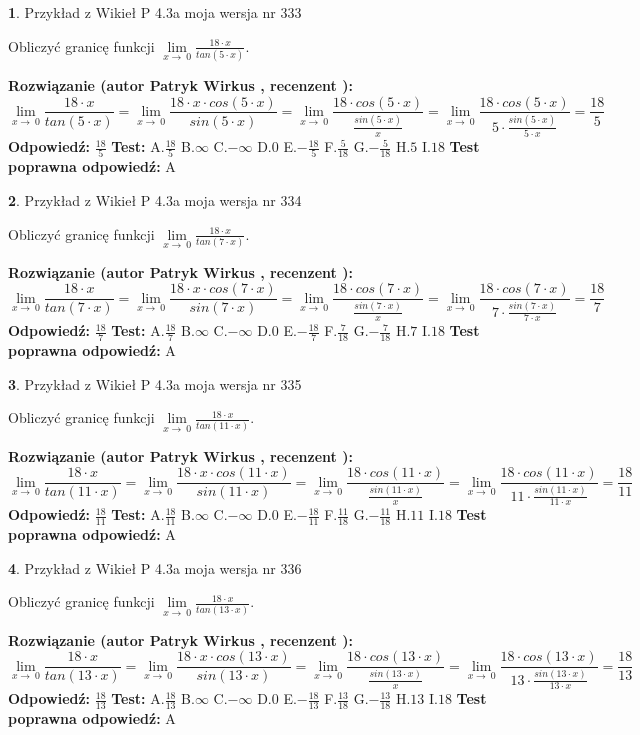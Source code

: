 \documentclass[12pt, a4paper]{article}
\theoremstyle{definition} %
\newtheorem{zad}{}
\newcommand{\zadStart}[1]{\begin{zad}#1\newline}
\newcommand{\zadStop}{\end{zad}}
\newcommand{\rozwStart}[2]{\noindent \textbf{Rozwiązanie (autor #1 , recenzent #2): }\newline}
\newcommand{\rozwStop}{\newline}
\newcommand{\odpStart}{\noindent \textbf{Odpowiedź:}\newline}
\newcommand{\odpStop}{\newline}
\newcommand{\testStart}{\noindent \textbf{Test:}\newline}
\newcommand{\testStop}{\newline}
\newcommand{\kluczStart}{\noindent \textbf{Test poprawna odpowiedź:}\newline}
\newcommand{\kluczStop}{\newline}
\begin{document}
\zadStart{Przykład z Wikieł P 4.3a moja wersja nr 333}


Obliczyć granicę funkcji $\lim\limits_{x\to\ 0}\frac{18 \cdot x}{tan(5 \cdot x)}$.
\zadStop
\rozwStart{Patryk Wirkus}{}
$$\lim\limits_{x\to\ 0}\frac{18 \cdot x}{tan(5 \cdot x)}=\lim\limits_{x\to\ 0}\frac{18 \cdot x \cdot cos(5 \cdot x)}{sin(5 \cdot x)}=\lim\limits_{x\to\ 0}\frac{18 \cdot cos(5 \cdot x)}{\frac{sin(5 \cdot x)}{x}}=\lim\limits_{x\to\ 0}\frac{18 \cdot cos(5 \cdot x)}{5 \cdot \frac{sin(5 \cdot x)}{5 \cdot x}} = \frac{18}{5}$$
\rozwStop
\odpStart
$\frac{18}{5}$
\odpStop
\testStart
A.$\frac{18}{5}$
B.$\infty$
C.$-\infty$
D.$0$
E.$-\frac{18}{5}$
F.$\frac{5}{18}$
G.$-\frac{5}{18}$
H.$5$
I.$18$
\testStop
\kluczStart
A
\kluczStop



\zadStart{Przykład z Wikieł P 4.3a moja wersja nr 334}


Obliczyć granicę funkcji $\lim\limits_{x\to\ 0}\frac{18 \cdot x}{tan(7 \cdot x)}$.
\zadStop
\rozwStart{Patryk Wirkus}{}
$$\lim\limits_{x\to\ 0}\frac{18 \cdot x}{tan(7 \cdot x)}=\lim\limits_{x\to\ 0}\frac{18 \cdot x \cdot cos(7 \cdot x)}{sin(7 \cdot x)}=\lim\limits_{x\to\ 0}\frac{18 \cdot cos(7 \cdot x)}{\frac{sin(7 \cdot x)}{x}}=\lim\limits_{x\to\ 0}\frac{18 \cdot cos(7 \cdot x)}{7 \cdot \frac{sin(7 \cdot x)}{7 \cdot x}} = \frac{18}{7}$$
\rozwStop
\odpStart
$\frac{18}{7}$
\odpStop
\testStart
A.$\frac{18}{7}$
B.$\infty$
C.$-\infty$
D.$0$
E.$-\frac{18}{7}$
F.$\frac{7}{18}$
G.$-\frac{7}{18}$
H.$7$
I.$18$
\testStop
\kluczStart
A
\kluczStop



\zadStart{Przykład z Wikieł P 4.3a moja wersja nr 335}


Obliczyć granicę funkcji $\lim\limits_{x\to\ 0}\frac{18 \cdot x}{tan(11 \cdot x)}$.
\zadStop
\rozwStart{Patryk Wirkus}{}
$$\lim\limits_{x\to\ 0}\frac{18 \cdot x}{tan(11 \cdot x)}=\lim\limits_{x\to\ 0}\frac{18 \cdot x \cdot cos(11 \cdot x)}{sin(11 \cdot x)}=\lim\limits_{x\to\ 0}\frac{18 \cdot cos(11 \cdot x)}{\frac{sin(11 \cdot x)}{x}}=\lim\limits_{x\to\ 0}\frac{18 \cdot cos(11 \cdot x)}{11 \cdot \frac{sin(11 \cdot x)}{11 \cdot x}} = \frac{18}{11}$$
\rozwStop
\odpStart
$\frac{18}{11}$
\odpStop
\testStart
A.$\frac{18}{11}$
B.$\infty$
C.$-\infty$
D.$0$
E.$-\frac{18}{11}$
F.$\frac{11}{18}$
G.$-\frac{11}{18}$
H.$11$
I.$18$
\testStop
\kluczStart
A
\kluczStop



\zadStart{Przykład z Wikieł P 4.3a moja wersja nr 336}


Obliczyć granicę funkcji $\lim\limits_{x\to\ 0}\frac{18 \cdot x}{tan(13 \cdot x)}$.
\zadStop
\rozwStart{Patryk Wirkus}{}
$$\lim\limits_{x\to\ 0}\frac{18 \cdot x}{tan(13 \cdot x)}=\lim\limits_{x\to\ 0}\frac{18 \cdot x \cdot cos(13 \cdot x)}{sin(13 \cdot x)}=\lim\limits_{x\to\ 0}\frac{18 \cdot cos(13 \cdot x)}{\frac{sin(13 \cdot x)}{x}}=\lim\limits_{x\to\ 0}\frac{18 \cdot cos(13 \cdot x)}{13 \cdot \frac{sin(13 \cdot x)}{13 \cdot x}} = \frac{18}{13}$$
\rozwStop
\odpStart
$\frac{18}{13}$
\odpStop
\testStart
A.$\frac{18}{13}$
B.$\infty$
C.$-\infty$
D.$0$
E.$-\frac{18}{13}$
F.$\frac{13}{18}$
G.$-\frac{13}{18}$
H.$13$
I.$18$
\testStop
\kluczStart
A
\kluczStop
\end{document}
